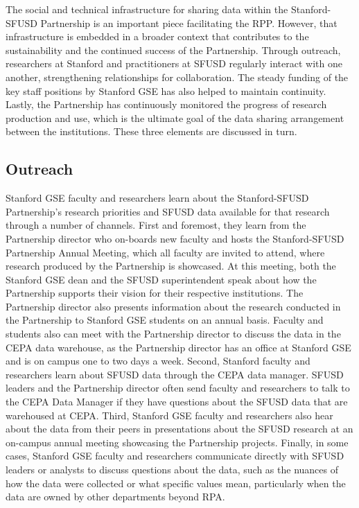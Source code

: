 The social and technical infrastructure for sharing data within the Stanford-SFUSD Partnership is an important piece facilitating the RPP. However, that infrastructure is embedded in a broader context that contributes to the sustainability and the continued success of the Partnership. Through outreach, researchers at Stanford and practitioners at SFUSD regularly interact with one another, strengthening relationships for collaboration. The steady funding of the key staff positions by Stanford GSE has also helped to maintain continuity. Lastly, the Partnership has continuously monitored the progress of research production and use, which is the ultimate goal of the data sharing arrangement between the institutions. These three elements are discussed in turn.

\hypertarget{outreach-3}{%
\subsection{Outreach}\label{outreach-3}}

Stanford GSE faculty and researchers learn about the Stanford-SFUSD Partnership's research priorities and SFUSD data available for that research through a number of channels. First and foremost, they learn from the Partnership director who on-boards new faculty and hosts the Stanford-SFUSD Partnership Annual Meeting, which all faculty are invited to attend, where research produced by the Partnership is showcased. At this meeting, both the Stanford GSE dean and the SFUSD superintendent speak about how the Partnership supports their vision for their respective institutions. The Partnership director also presents information about the research conducted in the Partnership to Stanford GSE students on an annual basis. Faculty and students also can meet with the Partnership director to discuss the data in the CEPA data warehouse, as the Partnership director has an office at Stanford GSE and is on campus one to two days a week. Second, Stanford faculty and researchers learn about SFUSD data through the CEPA data manager. SFUSD leaders and the Partnership director often send faculty and researchers to talk to the CEPA Data Manager if they have questions about the SFUSD data that are warehoused at CEPA. Third, Stanford GSE faculty and researchers also hear about the data from their peers in presentations about the SFUSD research at an on-campus annual meeting showcasing the Partnership projects. Finally, in some cases, Stanford GSE faculty and researchers communicate directly with SFUSD leaders or analysts to discuss questions about the data, such as the nuances of how the data were collected or what specific values mean, particularly when the data are owned by other departments beyond RPA.


